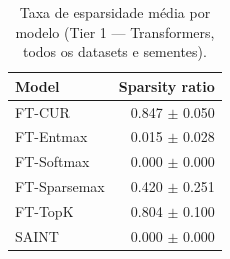 \begin{table}[ht]
  \centering
  \caption{Taxa de esparsidade média por modelo (Tier 1 — Transformers, todos os datasets e sementes).}
  \label{tab:tier1_transformers_sparsity}
  \begin{tabular}{lr}
    \toprule
    Model & Sparsity ratio \\
    \midrule
FT-CUR & 0.847 $\pm$ 0.050 \\
FT-Entmax & 0.015 $\pm$ 0.028 \\
FT-Softmax & 0.000 $\pm$ 0.000 \\
FT-Sparsemax & 0.420 $\pm$ 0.251 \\
FT-TopK & 0.804 $\pm$ 0.100 \\
SAINT & 0.000 $\pm$ 0.000 \\
    \bottomrule
  \end{tabular}
\end{table}